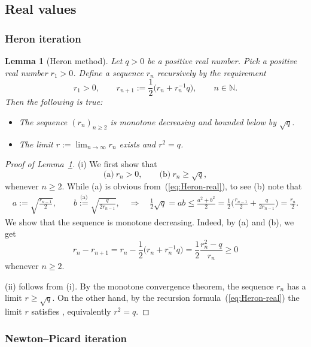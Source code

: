 \documentclass[pdftex]{sigma}
\numberwithin{equation}{section}
\newtheorem{Lemma}[Theorem]{Lemma}
\newcommand{\N}{{\mathbb{N}}}
\newcommand{\1}{{{\mathchoice {\rm 1\mskip-4mu l} {\rm 1\mskip-4mu l}
{\rm 1\mskip-4.5mu l} {\rm 1\mskip-5mu l}}}}
\begin{document}
\subsection{Real values}

\subsubsection{Heron iteration}

\begin{Lemma}[Heron method]\label{le:Heron-real}
Let $q>0$ be a positive real number.
Pick a positive real number $r_1>0$.
Define a sequence $r_n$ recursively by the requirement
\begin{equation}\label{eq:Heron-real}
 r_1>0
 ,\qquad
 r_{n+1}:=\frac12\bigl(r_n+r_n^{-1} q\bigr)
 ,\qquad
 n\in\N .
\end{equation}
Then the following is true:
\begin{itemize}\itemsep=0ex
\item[$(i)$]
 The sequence $(r_n)_{n\ge2}$ is monotone decreasing and bounded
 below by $\sqrt{q}$.
\item[$(ii)$]
 The limit $r:=\lim_{n\to\infty}r_n$ exists and $r^2=q$.
\end{itemize}
\end{Lemma}

\begin{proof}[Proof of Lemma~\ref{le:Heron-real}]
(i) We first show that
\[
 \text{(a)}\ r_n>0,
 \qquad
 \text{(b)}\ r_n\ge\sqrt{q},
\]
whenever $n\ge 2$.
While (a) is obvious from~(\ref{eq:Heron-real}), to see (b) note that
\begin{gather*}
 a:=\sqrt{\frac{r_{n-1}}{2}},\qquad
 b\stackrel{\text{(a)}}{:=}\sqrt{\frac{q}{2r_{n-1}}}
 , \quad\Rightarrow\quad
 \frac12\sqrt{q}
 =ab\le \frac{a^2+b^2}{2}
 =\frac12\biggl(\frac{r_{n-1}}{2}+\frac{q}{2r_{n-1}}\biggr)
 =\frac{r_n}{2}.
\end{gather*}
We show that the sequence is monotone decreasing.
Indeed, by (a) and (b), we get
\[
 r_n-r_{n+1}
 =r_n-\frac12\bigl(r_n+r_n^{-1} q\bigr)
 =\frac12 \frac{r_n^2-q}{r_n}\ge 0
\]
whenever $n\ge 2$.


(ii) follows from (i).
By the monotone convergence theorem,
the sequence $r_n$ has a limit $r\ge\sqrt{q}$.
On the other hand, by the recursion formula~(\ref{eq:Heron-real}) the
limit $r$ satisfies
,
equivalently $r^2=q$.
\end{proof}

\subsubsection{Newton--Picard iteration}
\end{document}

